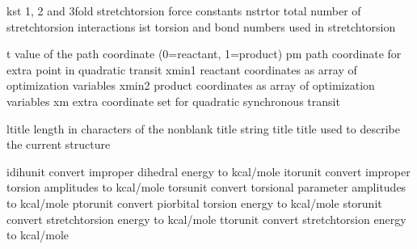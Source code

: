 \documentclass[letterpaper,11pt,english]{sphinxmanual}
\begin{document}

\begin{sphinxVerbatim}[commandchars=\\\{\}]
kst             1\PYGZhy{}, 2\PYGZhy{} and 3\PYGZhy{}fold stretch\PYGZhy{}torsion force constants
nstrtor         total number of stretch\PYGZhy{}torsion interactions
ist             torsion and bond numbers used in stretch\PYGZhy{}torsion
\end{sphinxVerbatim}


\begin{sphinxVerbatim}[commandchars=\\\{\}]
t               value of the path coordinate (0=reactant, 1=product)
pm              path coordinate for extra point in quadratic transit
xmin1           reactant coordinates as array of optimization variables
xmin2           product coordinates as array of optimization variables
xm              extra coordinate set for quadratic synchronous transit
\end{sphinxVerbatim}


\begin{sphinxVerbatim}[commandchars=\\\{\}]
ltitle          length in characters of the nonblank title string
title           title used to describe the current structure
\end{sphinxVerbatim}


\begin{sphinxVerbatim}[commandchars=\\\{\}]
idihunit        convert improper dihedral energy to kcal/mole
itorunit        convert improper torsion amplitudes to kcal/mole
torsunit        convert torsional parameter amplitudes to kcal/mole
ptorunit        convert pi\PYGZhy{}orbital torsion energy to kcal/mole
storunit        convert stretch\PYGZhy{}torsion energy to kcal/mole
ttorunit        convert stretch\PYGZhy{}torsion energy to kcal/mole
\end{sphinxVerbatim}

\end{document}
